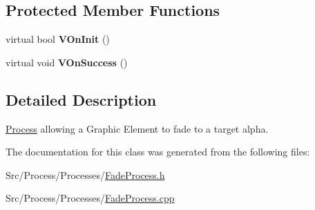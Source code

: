 \subsection*{Protected Member Functions}
\begin{DoxyCompactItemize}
\item 
\hypertarget{classFadeProcess_a29d6bd7cf8aa9fcf08be035f9e0cb91b}{virtual bool {\bfseries V\-On\-Init} ()}\label{classFadeProcess_a29d6bd7cf8aa9fcf08be035f9e0cb91b}

\item 
\hypertarget{classFadeProcess_a2abb64a20fb40d3d4cc3d1d8ceb60a70}{virtual void {\bfseries V\-On\-Success} ()}\label{classFadeProcess_a2abb64a20fb40d3d4cc3d1d8ceb60a70}

\end{DoxyCompactItemize}


\subsection{Detailed Description}
\hyperlink{classProcess}{Process} allowing a Graphic Element to fade to a target alpha. 

The documentation for this class was generated from the following files\-:\begin{DoxyCompactItemize}
\item 
Src/\-Process/\-Processes/\hyperlink{FadeProcess_8h}{Fade\-Process.\-h}\item 
Src/\-Process/\-Processes/\hyperlink{FadeProcess_8cpp}{Fade\-Process.\-cpp}\end{DoxyCompactItemize}
